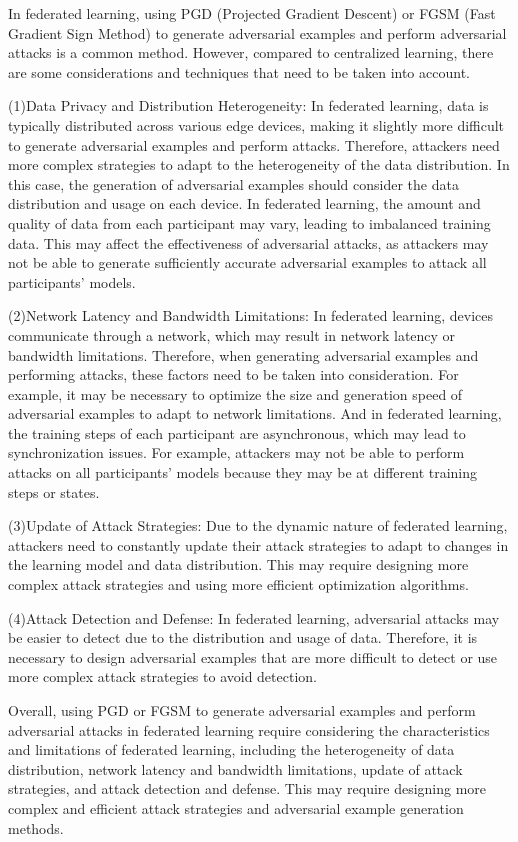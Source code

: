 \documentclass[a4paper,fleqn]{cas-dc}
\begin{document}
In federated learning, using PGD (Projected Gradient Descent) or FGSM
(Fast Gradient Sign Method) to generate adversarial examples and perform
adversarial attacks is a common method. However, compared to centralized
learning, there are some considerations and techniques that need to be
taken into account.

(1)Data Privacy and Distribution Heterogeneity: In
federated learning, data is typically distributed across
various edge devices, making it slightly more diﬀicult to
generate adversarial examples and perform attacks.
Therefore, attackers need more complex strategies to adapt to
the heterogeneity of the data distribution. In this case,
the generation of adversarial examples should consider the
data distribution and usage on each device. In federated
learning, the amount and quality of data from each
participant may vary, leading to imbalanced training data.
This may affect the effectiveness of adversarial attacks, as
attackers may not be able to generate suﬀiciently accurate
adversarial examples to attack all participants' models.

(2)Network Latency and Bandwidth Limitations:
In federated learning, devices communicate through a
network, which may result in network latency or
bandwidth limitations. Therefore, when generating adversarial
examples and performing attacks, these factors need to
be taken into consideration. For example, it may be
necessary to optimize the size and generation speed of
adversarial examples to adapt to network limitations. And
in federated learning, the training steps of each participant
are asynchronous, which may lead to synchronization
issues. For example, attackers may not be able to perform
attacks on all participants' models because they may be
at different training steps or states.

(3)Update of Attack Strategies: Due to the dynamic
nature of federated learning, attackers need to constantly
update their attack strategies to adapt to changes in the
learning model and data distribution. This may require
designing more complex attack strategies and using more
eﬀicient optimization algorithms.

(4)Attack Detection and Defense: In federated learning,
adversarial attacks may be easier to detect due to the
distribution and usage of data. Therefore, it is necessary
to design adversarial examples that are more diﬀicult to
detect or use more complex attack strategies to avoid
detection.

Overall, using PGD or FGSM to generate adversarial
examples and perform adversarial attacks in federated
learning require considering the characteristics and limitations of federated learning, including the heterogeneity
of data distribution, network latency and bandwidth limitations,
update of attack strategies, and attack detection
and defense. This may require designing more complex
and eﬀicient attack strategies and adversarial example
generation methods.
\end{document}
